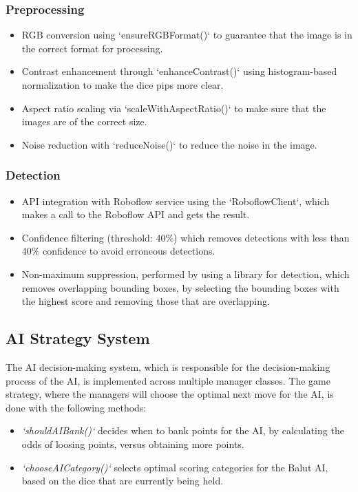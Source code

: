 \subsubsection{Preprocessing}
    \begin{itemize}
        \item RGB conversion using `ensureRGBFormat()` to guarantee that the image is in the correct format for processing.
        \item Contrast enhancement through `enhanceContrast()` using histogram-based normalization to make the dice pips more clear.
        \item Aspect ratio scaling via `scaleWithAspectRatio()` to make sure that the images are of the correct size.
        \item Noise reduction with `reduceNoise()` to reduce the noise in the image.
    \end{itemize}
\subsubsection{Detection}
    \begin{itemize}
        \item API integration with Roboflow service using the `RoboflowClient`, which makes a call to the Roboflow API and gets the result.
        \item Confidence filtering (threshold: 40\%) which removes detections with less than 40\% confidence to avoid erroneous detections.
        \item Non-maximum suppression, performed by using a library for detection, which removes overlapping bounding boxes, by selecting the bounding boxes with the highest score and removing those that are overlapping.
    \end{itemize}

\subsection{AI Strategy System}

The AI decision-making system, which is responsible for the decision-making process of the AI, is implemented across multiple manager classes. The game strategy, where the managers will choose the optimal next move for the AI, is done with the following methods:
\begin{itemize}
   \item  \textit{`shouldAIBank()`} decides when to bank points for the AI, by calculating the odds of loosing points, versus obtaining more points.
    \item \textit{`chooseAICategory()`} selects optimal scoring categories for the Balut AI, based on the dice that are currently being held.
\end{itemize}

